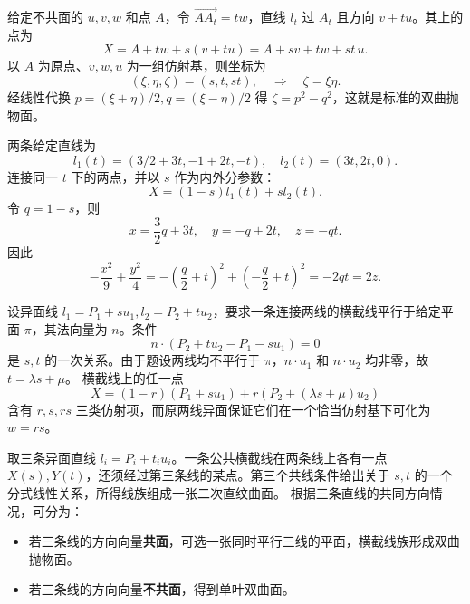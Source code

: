 给定不共面的 $u,v,w$ 和点 $A$，令 $\overrightarrow{AA_t}=tw$，直线 $l_t$ 过 $A_t$ 且方向 $v+tu$。其上的点为
\[X=A+tw+s(v+tu)=A+sv+tw+st\,u.\]
以 $A$ 为原点、$v,w,u$ 为一组仿射基，则坐标为
\[(\xi,\eta,\zeta)=(s,t,st),\quad\Longrightarrow\quad \boxed{\zeta=\xi\eta}.\]
经线性代换 $p=(\xi+\eta)/2,q=(\xi-\eta)/2$ 得 $\zeta=p^2-q^2$，这就是标准的双曲抛物面。

两条给定直线为
\[l_1(t)=(3/2+3t,-1+2t,-t),\quad l_2(t)=(3t,2t,0).\]
连接同一 $t$ 下的两点，并以 $s$ 作为内外分参数：
\[X=(1-s)l_1(t)+s l_2(t).\]
令 $q=1-s$，则
\[x=\frac32q+3t,\quad y=-q+2t,\quad z=-qt.\]
因此
\[-\frac{x^2}{9}+\frac{y^2}{4}=-\left(\frac q2+t\right)^2+\left(-\frac q2+t\right)^2=-2qt=2z.\]

设异面线 $l_1=P_1+s u_1,l_2=P_2+t u_2$，要求一条连接两线的横截线平行于给定平面 $\pi$，其法向量为 $n$。条件
\[n\cdot(P_2+t u_2-P_1-s u_1)=0\]
是 $s,t$ 的一次关系。由于题设两线均不平行于 $\pi$，$n\cdot u_1$ 和 $n\cdot u_2$ 均非零，故 $t=\lambda s+\mu$。
横截线上的任一点
\[X=(1-r)(P_1+s u_1)+r(P_2+(\lambda s+\mu)u_2)\]
含有 $r,s,rs$ 三类仿射项，而原两线异面保证它们在一个恰当仿射基下可化为 $w=rs$。

取三条异面直线 $l_i=P_i+t_i u_i$。一条公共横截线在两条线上各有一点 $X(s),Y(t)$，还须经过第三条线的某点。第三个共线条件给出关于 $s,t$ 的一个分式线性关系，所得线族组成一张二次直纹曲面。
根据三条直线的共同方向情况，可分为：
\begin{itemize}
\item 若三条线的方向向量\textbf{共面}，可选一张同时平行三线的平面，横截线族形成双曲抛物面。
\item 若三条线的方向向量\textbf{不共面}，得到单叶双曲面。
\end{itemize}

